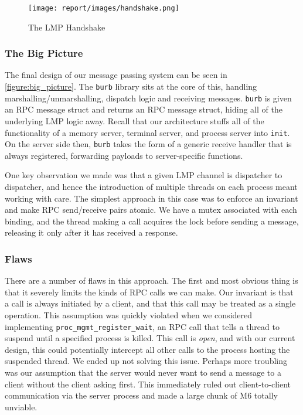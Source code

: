 \begin{figure}[h!] 
	\texttt{[image: report/images/handshake.png]}
	\caption{The LMP Handshake}
	\label{figure:handshake}
	\centering
\end{figure}

\subsubsection*{The Big Picture} \label{sec:big_picture}

The final design of our message passing system can be seen in \autoref{figure:big_picture}. The \verb|burb| library sits at the core of this, handling marshalling/unmarshalling, dispatch logic and receiving messages. \verb|burb| is given an RPC message struct and returns an RPC message struct, hiding all of the underlying LMP logic away. Recall that our architecture stuffs all of the functionality of a memory server, terminal server, and process server into \verb|init|. On the server side then, \verb|burb| takes the form of a generic receive handler that is always registered, forwarding payloads to server-specific functions.

One key observation we made was that a given LMP channel is dispatcher to dispatcher, and hence the introduction of multiple threads on each process meant working with care. The simplest approach in this case was to enforce an invariant and make RPC send/receive pairs atomic. We have a mutex associated with each binding, and the thread making a call acquires the lock before sending a message, releasing it only after it has received a response. 

\subsubsection*{Flaws} \label{sec:flaws}

There are a number of flaws in this approach. The first and most obvious thing is that it severely limits the kinds of RPC calls we can make. Our invariant is that a call is always initiated by a client, and that this call may be treated as a single operation. This assumption was quickly violated when we considered implementing \verb|proc_mgmt_register_wait|, an RPC call that tells a thread to suspend until a specified process is killed. This call is \emph{open}, and with our current design, this could potentially intercept all other calls to the process hosting the suspended thread. We ended up not solving this issue. Perhaps more troubling was our assumption that the server would never want to send a message to a client without the client asking first. This immediately ruled out client-to-client communication via the server process and made a large chunk of M6 totally unviable.

